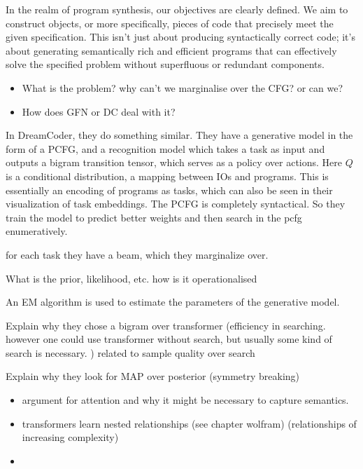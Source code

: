 In the realm of program synthesis, our objectives are clearly defined. We aim to construct objects, or more specifically, pieces of code that precisely meet the given specification. This isn't just about producing syntactically correct code; it's about generating semantically rich and efficient programs that can effectively solve the specified problem without superfluous or redundant components.







\begin{itemize}
    \item What is the problem? why can't we marginalise over the CFG? or can we? 
    \item How does GFN or DC deal with it? 
\end{itemize}



In DreamCoder, they do something similar. They have a generative model in the form of a PCFG, and a recognition model which takes a task as input and outputs a bigram transition tensor, which serves as a policy over actions. Here $Q$ is a conditional distribution, a mapping between IOs and programs. This is essentially an encoding of programs as tasks, which can also be seen in their visualization of task embeddings.
The PCFG is completely syntactical.
So they train the model to predict better weights and then search in the pcfg enumeratively. 

for each task they have a beam, which they marginalize over. 

What is the prior, likelihood, etc. how is it operationalised

An EM algorithm is used to estimate the parameters of the generative model. 

Explain why they chose a bigram over transformer (efficiency in searching. however one could use transformer without search, but usually some kind of search is necessary. ) related to sample quality over search

Explain why they look for MAP over posterior (symmetry breaking)

\begin{itemize}
    \item argument for attention and why it might be necessary to capture semantics.
    \item transformers learn nested relationships (see chapter wolfram) (relationships of increasing complexity)
    \item 
\end{itemize}

